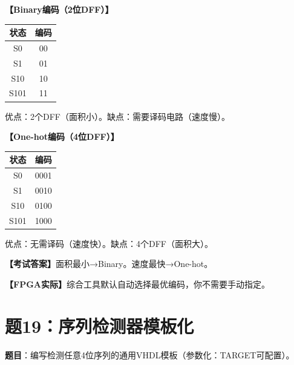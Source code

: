 \begin{solution}[完整解答]

\textbf{【Binary编码（2位DFF）】}
\begin{center}
\begin{tabular}{|c|c|}\hline
状态 & 编码 \\ \hline
S0 & 00 \\ \hline S1 & 01 \\ \hline
S10 & 10 \\ \hline S101 & 11 \\ \hline
\end{tabular}
\end{center}
优点：2个DFF（面积小）。缺点：需要译码电路（速度慢）。

\textbf{【One-hot编码（4位DFF）】}
\begin{center}
\begin{tabular}{|c|c|}\hline
状态 & 编码 \\ \hline
S0 & 0001 \\ \hline S1 & 0010 \\ \hline
S10 & 0100 \\ \hline S101 & 1000 \\ \hline
\end{tabular}
\end{center}
优点：无需译码（速度快）。缺点：4个DFF（面积大）。

\textbf{【考试答案】}面积最小→Binary。速度最快→One-hot。

\textbf{【FPGA实际】}综合工具默认自动选择最优编码，你不需要手动指定。

\end{solution}


\section{题19：序列检测器模板化}

\textbf{题目}：编写检测任意4位序列的通用VHDL模板（参数化：TARGET可配置）。

